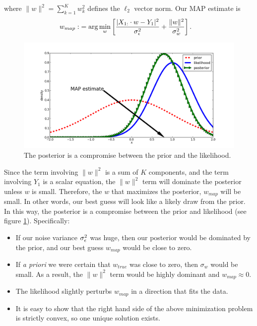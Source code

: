 where $\|w\|^2 = \sum_{k=1}^K w_k^2$ defines the $\ell_2$ vector norm.  Our MAP estimate is
\begin{align*}
  w_{map} :&= \arg\min_w \left[  \frac{|X_{1:}\cdot w - Y_1|^2}{\sigma_{\epsilon}^2} + \frac{\|w\|^2}{\sigma_w^2}\right].
\end{align*}
\begin{figure}
  \includegraphics[width=\textwidth]{../images/gaussian-bayesian}
  \caption{The posterior is a compromise between the prior and the likelihood.}
  \label{linear:fig:gaussian-bayesian}
\end{figure}
Since the term involving $\|w\|^2$ is a sum of $K$ components, and the term involving $Y_1$ is a scalar equation, the $\|w\|^2$ term will dominate the posterior unless $w$ is small.  Therefore,  the $w$ that maximizes the posterior, $w_{map}$ will be small.  In other words, our best guess will look like a likely draw from the prior.  In this way, the posterior is a compromise between the prior and likelihood (see figure \ref{linear:fig:gaussian-bayesian}).  Specifically:
\begin{itemize}
  \item If our noise variance $\sigma_{\epsilon}^2$ was huge, then our posterior would be dominated by the prior, and our best guess $w_{map}$ would be close to zero. 
  \item If \emph{a priori} we were certain that $w_{true}$ was close to zero, then $\sigma_w$ would be small.  As a result, the $\|w\|^2$ term would be highly dominant and $w_{map}\approx0$.
  \item The likelihood slightly perturbs $w_{map}$ in a direction that fits the data.
  \item It is easy to show that the right hand side of the above minimization problem is strictly convex, so one unique solution exists.
\end{itemize}

